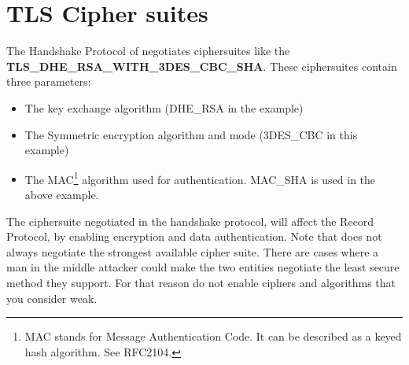 \newpage
\section{TLS Cipher suites}
\par 
The Handshake Protocol of \tlsI{} negotiates ciphersuites 
like the {\bf TLS\_DHE\_RSA\_WITH\_3DES\_CBC\_SHA}.
These ciphersuites contain three parameters:
\begin{itemize}
\item The key exchange algorithm (DHE\_RSA in the example)
\item The Symmetric encryption algorithm and mode (3DES\_CBC in this
example)
\item The MAC\footnote{MAC stands for Message Authentication Code. It can
be described as a keyed hash algorithm. See RFC2104.} algorithm used for authentication.
MAC\_SHA is used in the above example.
\end{itemize}

The ciphersuite negotiated in the handshake protocol, will affect 
the Record Protocol, by enabling encryption and data authentication.
Note that \tlsI does not always
negotiate the strongest available cipher suite. There are cases where
a man in the middle attacker could make the two entities negotiate
the least secure method they support. For that reason do not enable
ciphers and algorithms that you consider weak.

\addvspace{1.5cm}

